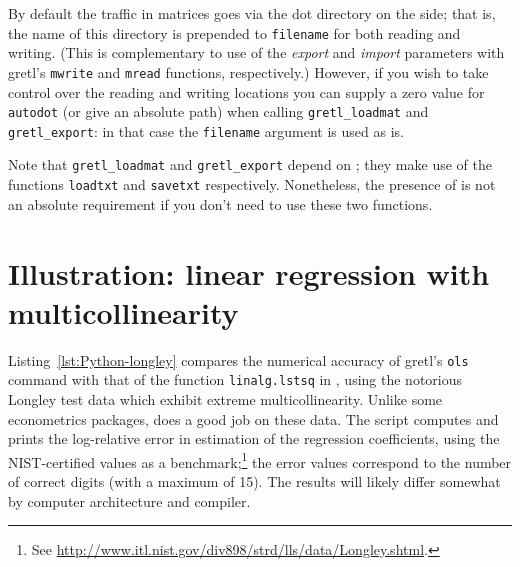 By default the traffic in matrices goes via the dot directory on the
 side; that is, the name of this directory is prepended to
\texttt{filename} for both reading and writing. (This is complementary
to use of the \textsl{export} and \textsl{import} parameters with
gretl's \texttt{mwrite} and \texttt{mread} functions, respectively.)
However, if you wish to take control over the reading and writing
locations you can supply a zero value for \texttt{autodot} (or give an
absolute path) when calling \verb|gretl_loadmat| and
\verb|gretl_export|: in that case the \texttt{filename} argument is
used as is.

Note that \verb|gretl_loadmat| and \verb|gretl_export| depend on
; they make use of the functions \texttt{loadtxt} and
\texttt{savetxt} respectively. Nonetheless, the presence of
 is not an absolute requirement if you don't need
to use these two functions.

\section{Illustration: linear regression with multicollinearity}
\label{sec:Python-longley}

Listing~\ref{lst:Python-longley} compares the numerical accuracy of
gretl's \texttt{ols} command with that of the function
\texttt{linalg.lstsq} in , using the notorious Longley test
data which exhibit extreme multicollinearity.  Unlike some
econometrics packages,  does a good job on these data. The
script computes and prints the log-relative error in estimation of the
regression coefficients, using the NIST-certified values as a
benchmark;\footnote{See
  \url{http://www.itl.nist.gov/div898/strd/lls/data/Longley.shtml}.}
the error values correspond to the number of correct digits (with a
maximum of 15). The results will likely differ somewhat by computer
architecture and compiler.

